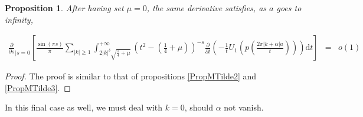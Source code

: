 \documentclass{jams-l}
\newtheorem{proposition}[theorem]{Proposition}
\theoremstyle{definition}
\theoremstyle{remark}
\numberwithin{equation}{section}
\begin{document}
\begin{proposition}
                    \noindent After having set $\mu = 0$, the same derivative satisfies, as $a$ goes to infinity,
                    
                    \[ \begin{array}{lll}
                            \scriptstyle \frac{\partial}{\partial s}_{\left \vert s = 0 \right.} \left[ \frac{\sin \left( \pi s \right)}{\pi} \sum\limits_{\left \vert k \right \vert \geqslant 1} \int_{2 \left \vert k \right \vert^{\delta} \sqrt{\frac{1}{4} + \mu}}^{+ \infty} \left( t^2 - \left( \frac{1}{4} + \mu \right) \right)^{-s} \frac{\partial}{\partial t} \left( - \frac{1}{t} U_1 \left( p \left( \frac{2 \pi \left \vert k + \alpha \right \vert a}{t} \right) \right) \right) \mathrm{d}t \right] & \scriptstyle = & \scriptstyle o \left( 1 \right)
                        \end{array} \]
                
                \end{proposition}
                
                \begin{proof}
                
                    The proof is similar to that of propositions \ref{PropMTilde2} and \ref{PropMTilde3}.
                
                \end{proof}
                
                In this final case as well, we must deal with $k = 0$, should $\alpha$ not vanish.
                
\end{document}
